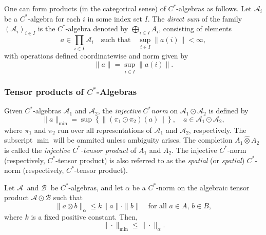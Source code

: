 \begin{definition} \label{def:c*_direct_sum}
  One can form products (in the categorical sense) of \( C^* \)-algebras as follows.  
Let \( \mathscr{A}_i \) be a \( C^* \)-algebra for each \( i \) in some index set \( I \).  
The \emph{direct sum} of the family \( (\mathscr{A}_i)_{i \in I} \) is the \( C^* \)-algebra denoted by \( \bigoplus_{i \in I} A_i \), consisting of elements
\[
a \in \prod_{i \in I} \mathscr{A}_i \quad \text{such that} \quad \sup_{i \in I} \|a(i)\| < \infty,
\]
with operations defined coordinatewise and norm given by
\[
\|a\| = \sup_{i \in I} \|a(i)\|.
\]
\end{definition}



\subsubsection{Tensor products of $C^*$-Algebras}


\begin{definition} \label{def:min_tensor_c*}
  Given $C^*$-algebras $\mathscr{A}_1$ and $\mathscr{A}_2$, the \emph{injective} $C^*$\emph{norm} on $\mathscr{A}_1 \odot \mathscr{A}_2$ is defined by
\[
\|a\|_{\min} = \sup \left\{ \|(\pi_1 \odot \pi_2)(a)\| \right\},
\quad a \in \mathscr{A}_1 \odot \mathscr{A}_2,
\]
where $\pi_1$ and $\pi_2$ run over all  representations of $\mathscr{A}_1$ and $\mathscr{A}_2$, respectively. The subscript $\min$  will be ommited unless ambiguity arises.
The completion $A_1 \widehat{\otimes} A_2$ is called the \emph{injective $C^*$-tensor product} of $A_1$ and $A_2$. The injective  $C^*$-norm (respectively, $C^*$-tensor product) is also referred to as the \emph{spatial} (or \emph{spatial}) $C^*$-norm (respectively, $C^*$-tensor product).
\end{definition}

\begin{proposition} \cite[Proposition 1.22.7]{sakaiCAlgebrasWAlgebras1998} \label{prop:sakai_tensor_min}
  Let \( \mathscr{A}\ \) and \( \mathscr{B}\ \) be \( C^* \)-algebras, and let \( \alpha \) be a \( C^* \)-norm on the algebraic tensor product \( \mathscr{A} \odot \mathscr{B} \) such that
\[
\|a \otimes b\|_{\alpha} \leq k \|a\| \cdot \|b\| \quad \text{for all } a \in A,\, b \in B,
\]
where \( k \) is a fixed positive constant.
Then,
\[
\|\cdot\|_{\min} \leq \|\cdot\|_{\alpha}.
\]
\end{proposition}

